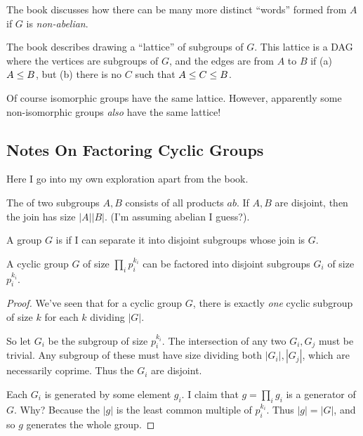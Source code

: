 \documentclass[11pt, oneside]{amsart}
\begin{document}
\begin{remark}
  The book discusses how there can be many more distinct ``words''
  formed from $A$ if $G$ is \emph{non-abelian}.
\end{remark}

\begin{remark}
  The book describes drawing a ``lattice'' of subgroups of $G$. This
  lattice is a DAG where the vertices are subgroups of $G$, and the
  edges are from $A$ to $B$ if (a) $A \leq B$, but (b) there is no
  $C$ such that $A \leq C \leq B$.

  Of course isomorphic groups have the same lattice. However, apparently
  some non-isomorphic groups \emph{also} have the same lattice!
\end{remark}

\subsection{Notes On Factoring Cyclic Groups}

\begin{remark}
  Here I go into my own exploration apart from the book.
\end{remark}

\begin{definition}
  The  of two subgroups $A, B$ consists of all products
  $ab$. If $A, B$ are disjoint, then the join has size $|A||B|$. (I'm
  assuming abelian I guess?).

  A group $G$ is  if I can separate it into disjoint
  subgroups whose join is $G$.
\end{definition}

\begin{theorem}
  A cyclic group $G$ of size $\prod_i p_i^{k_i}$ can be factored into
  disjoint subgroups $G_i$ of size $p_i^{k_i}$.
\end{theorem}

\begin{proof}
  We've seen that for a cyclic group $G$, there is exactly \emph{one}
  cyclic subgroup of size $k$ for each $k$ dividing $|G|$.

  So let $G_i$ be the subgroup of size $p_i^{k_i}$. The intersection of
  any two $G_i, G_j$ must be trivial. Any subgroup of these must have
  size dividing both $|G_i|, |G_j|$, which are necessarily coprime. Thus
  the $G_i$ are disjoint.

  Each $G_i$ is generated by some element $g_i$. I claim that $g =
  \prod_i g_i$ is a generator of $G$. Why? Because the $|g|$ is the
  least common multiple of $p_i^{k_i}$. Thus $|g| = |G|$, and so $g$
  generates the whole group.
\end{proof}
\end{document}
